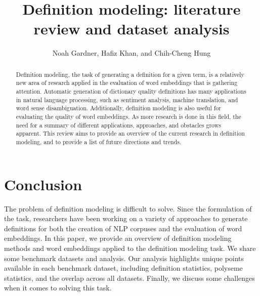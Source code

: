 \documentclass{aims}
\numberwithin{equation}{section}
\begin{document}
\title{Definition modeling: literature review and dataset analysis}

\author{%
    Noah Gardner,
    Hafiz Khan,
    and Chih-Cheng Hung\corrauth
}%


\address{%
    }


\begin{abstract}
    Definition modeling, the task of generating a definition for a given term,
    is a relatively new area of research applied in the evaluation of word
    embeddings that is gathering attention. Automatic generation of dictionary
    quality definitions has many applications in natural language processing,
    such as sentiment analysis, machine translation, and word sense
    disambiguation. Additionally, definition modeling is also useful for
    evaluating the quality of word embeddings. As more research is done in this
    field, the need for a summary of different applications, approaches, and
    obstacles grows apparent. This review aims to provide an overview of the
    current research in definition modeling, and to provide a list of future
    directions and trends.
\end{abstract}
\maketitle





\FloatBarrier


\FloatBarrier
\section{Conclusion}
The problem of definition modeling is difficult to solve. Since the formulation
of the task, researchers have been working on a variety of approaches to
generate definitions for both the creation of NLP corpuses and the evaluation of
word embeddings. In this paper, we provide an overview of definition modeling
methods and word embeddings applied to the definition modeling task. We share
some benchmark datasets and analysis. Our analysis highlights unique points
available in each benchmark dataset, including definition statistics, polyseme
statistics, and the overlap across all datasets. Finally, we discuss some
challenges when it comes to solving this task.
\end{document}
